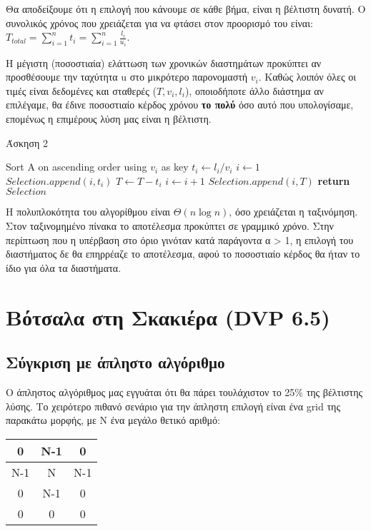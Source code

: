 \documentclass[a4paper,11pt]{article}
\begin{document}
Θα αποδείξουμε ότι η επιλογή που κάνουμε σε κάθε βήμα, είναι η βέλτιστη
δυνατή.
Ο συνολικός χρόνος που χρειάζεται για να φτάσει στον προορισμό του είναι: \\
$T_{total}=\displaystyle\sum\limits_{i=1}^n{t_i} =
\displaystyle\sum\limits_{i=1}^n{\frac{l_i}{u_i}}$.

Η μέγιστη (ποσοστιαία) ελάττωση των χρονικών διαστημάτων προκύπτει αν
προσθέσουμε την ταχύτητα u στο μικρότερο παρονομαστή $v_i$. Kαθώς λοιπόν
όλες οι τιμές είναι δεδομένες και σταθερές ($T, v_i, l_i$), οποιοδήποτε άλλο
διάστημα αν επιλέγαμε, θα έδινε ποσοστιαίο κέρδος χρόνου \textbf{το πολύ} όσο αυτό
που υπολογίσαμε, επομένως η επιμέρους λύση μας είναι η βέλτιστη.\\

\begin{algorithm}[H]
\caption{Άσκηση 2}
\begin{algorithmic}[1]
    \State Sort A on ascending order using $v_i$ as key
	\State $t_i \gets l_i / v_i$
    \EndFor
{}
    \State $i \gets 1$
	\State $Selection.append (i,t_i)$
	\State $T \gets T - t_i$
        \State $i \gets i+1$
    \EndWhile
    \State $Selection.append (i, T)$
    \State \textbf{return} $Selection$
\EndProcedure
\end{algorithmic}
\end{algorithm}

Η πολυπλοκότητα του αλγορίθμου είναι $\Theta(n\log{n})$, όσο χρειάζεται η
ταξινόμηση. Στον ταξινομημένο πίνακα το αποτέλεσμα προκύπτει σε γραμμικό
χρόνο.
Στην περίπτωση που η υπέρβαση στο όριο γινόταν κατά παράγοντα α > 1, η επιλογή
του διαστήματος δε θα επηρρέαζε το αποτέλεσμα, αφού το ποσοστιαίο κέρδος θα
ήταν το ίδιο για όλα τα διαστήματα.


\section{Βότσαλα στη Σκακιέρα (DVP 6.5)}
\subsection{Σύγκριση με άπληστο αλγόριθμο}
Ο άπληστος αλγόριθμος μας εγγυάται ότι θα πάρει τουλάχιστον το 25\% της
βέλτιστης λύσης. Το χειρότερο πιθανό σενάριο για την άπληστη επιλογή είναι ένα
grid της παρακάτω μορφής, με N ένα μεγάλο θετικό αριθμό:
\begin{center}
    \begin{tabular}{| c | c | c | }
    \hline
    0 & Ν-1 & 0 \\ \hline
    Ν-1 & Ν & Ν-1 \\ \hline
    0 & Ν-1 & 0 \\ \hline
    0 & 0 & 0 \\
    \hline
    \end{tabular}
\end{center}
\end{document}

